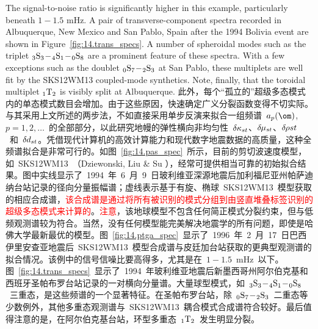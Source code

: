 %
The signal-to-noise ratio is significantly higher in
this example, particularly beneath $1\!-\!1.5$ mHz.
A pair of transverse-component spectra recorded
in Albuquerque, New Mexico and
San Pablo, Spain after the 1994 Bolivia
event are shown in Figure~\ref{fig:14.trans_specs}.
A number of spheroidal modes such as the triplet
${}_3{\rm S}_3\!-\!{}_4{\rm S}_1\!-\!{}_0{\rm S}_8$
are a prominent feature of these spectra.  With a few
exceptions such as the doublet ${}_0{\rm S}_7\!-\!{}_2{\rm S}_3$
at San Pablo, these multiplets are well fit by the SKS12WM13
coupled-mode synthetics.  Note, finally, that the toroidal
multiplet ${}_1{\rm T}_2$ is visibly split at Albuquerque.
\fi
此外，每个“孤立的”超级多态模式内的单态模式数目会增加。由于这些原因，快速确定广义分裂函数变得不切实际。与其采用上文所述的两步法，不如直接采用单步反演来拟合一组频谱~$a_p(\om)$, $p=1,2,\ldots$~的全部部分，以此研究地幔的弹性横向非均匀性~$\delta\hspace{-0.1 mm}\kappa_{st}$、$\delta\hspace{-0.2 mm}\mu_{st}$、$\delta\hspace{-0.2 mm}\rho{st}$~和~$\delta\hspace{-0.1 mm}d_{st}$。凭借现代计算机的高效计算能力和现代数字地震数据的高质量，这种全频谱拟合是非常可行的。如图~\ref{fig:14.pas_spec}~所示，目前的剪切波速度模型，如~SKS12WM13~（Dziewonski, Liu \& Su  \citeyear{liu&dziewonski96}），经常可提供相当可靠的初始拟合结果。图中实线显示了~1994~年~6~月~9~日玻利维亚深源地震后加利福尼亚州帕萨迪纳台站记录的径向分量振幅谱；虚线表示基于有旋、椭球~SKS12WM13~模型获取的相应合成谱，\textcolor{red}{该合成谱是通过将所有被识别的模式分组到由竖直堆叠标签识别的超级多态模式来计算的}。\textcolor{red}{注意}，该地球模型不包含任何简正模式分裂约束，但与低频观测谱较为符合。当然，没有任何模型能完美解决地震学的所有问题，即使是哈佛大学最新最优的模型。图~\ref{fig:14.ptga_spec}~显示了~1996~年~2~月~17~日巴西伊里安查亚地震后~SKS12WM13~模型合成谱与皮廷加台站获取的更典型观测谱的拟合情况。该例中的信号信噪比要高得多，尤其是在~$1\!-\!1.5$~mHz~以下。图~\ref{fig:14.trans_specs}~显示了~1994~年玻利维亚地震后新墨西哥州阿尔伯克基和西班牙圣帕布罗台站记录的一对横向分量谱。大量球型模式，如~${}_3{\rm S}_3\!-\!{}_4{\rm S}_1\!-\!{}_0{\rm S}_8$~三重态，是这些频谱的一个显著特征。在圣帕布罗台站，除~${}_0{\rm S}_7\!-\!{}_2{\rm S}_3$~二重态等少数例外，其他多重态观测谱与~SKS12WM13~耦合模式合成谱符合较好。最后值得注意的是，在阿尔伯克基台站，环型多重态~${}_1{\rm T}_2$~发生明显分裂。
%
%

